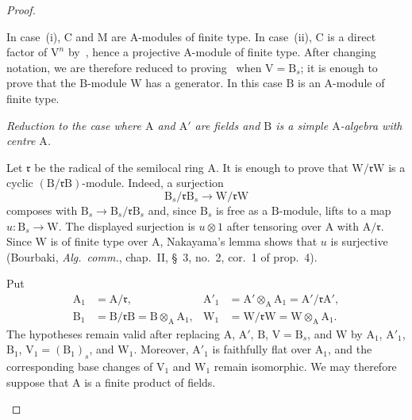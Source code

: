 \begin{proof}
\begin{env}[2.5.8.7]
In case~(i), $\mathrm{C}$ and $\mathrm{M}$ are $\mathrm{A}$-modules of
finite type. In case~(ii), $\mathrm{C}$ is a direct factor of
$\mathrm{V}^n$ by~, hence a projective
$\mathrm{A}$-module of finite type. After changing notation, we are
therefore reduced to proving~ when
$\mathrm{V}=\mathrm{B}_s$; it is enough to prove that the
$\mathrm{B}$-module $\mathrm{W}$ has a generator. In this case
$\mathrm{B}$ is an $\mathrm{A}$-module of finite type.
\end{env}

\begin{env}[2.5.8.8]
\label{IV.2.5.8.8}
\emph{Reduction to the case where $\mathrm{A}$ and $\mathrm{A}'$ are
fields and $\mathrm{B}$ is a simple $\mathrm{A}$-algebra with centre
$\mathrm{A}$.}

Let $\mathfrak{r}$ be the radical of the semilocal ring $\mathrm{A}$.
It is enough to prove that
$\mathrm{W}/\mathfrak{r}\mathrm{W}$ is a cyclic
$(\mathrm{B}/\mathfrak{r}\mathrm{B})$-module. Indeed, a surjection
\[
  \mathrm{B}_s/\mathfrak{r}\mathrm{B}_s
  \longrightarrow \mathrm{W}/\mathfrak{r}\mathrm{W}
\]
composes with $\mathrm{B}_s\to
\mathrm{B}_s/\mathfrak{r}\mathrm{B}_s$ and, since $\mathrm{B}_s$ is
free as a $\mathrm{B}$-module, lifts to a map
$u:\mathrm{B}_s\to\mathrm{W}$. The displayed surjection is
$u\otimes1$ after tensoring over $\mathrm{A}$ with
$\mathrm{A}/\mathfrak{r}$. Since $\mathrm{W}$ is of finite type over
$\mathrm{A}$, Nakayama's lemma shows that $u$ is surjective (Bourbaki,
\emph{Alg.\ comm.}, chap.~II, \S~3, no.~2, cor.~1 of prop.~4).

Put
\[
\begin{aligned}
  \mathrm{A}_1&=\mathrm{A}/\mathfrak{r},&
  \mathrm{A}'_1&=\mathrm{A}'\otimes_{\mathrm{A}}\mathrm{A}_1
                    =\mathrm{A}'/\mathfrak{r}\mathrm{A}',\\
  \mathrm{B}_1&=\mathrm{B}/\mathfrak{r}\mathrm{B}
                    =\mathrm{B}\otimes_{\mathrm{A}}\mathrm{A}_1,&
  \mathrm{W}_1&=\mathrm{W}/\mathfrak{r}\mathrm{W}
                    =\mathrm{W}\otimes_{\mathrm{A}}\mathrm{A}_1.
\end{aligned}
\]
The hypotheses remain valid after replacing $\mathrm{A}$, $\mathrm{A}'$,
$\mathrm{B}$, $\mathrm{V}=\mathrm{B}_s$, and $\mathrm{W}$ by
$\mathrm{A}_1$, $\mathrm{A}'_1$, $\mathrm{B}_1$,
$\mathrm{V}_1=(\mathrm{B}_1)_s$, and $\mathrm{W}_1$. Moreover,
$\mathrm{A}'_1$ is faithfully flat over $\mathrm{A}_1$, and the
corresponding base changes of $\mathrm{V}_1$ and $\mathrm{W}_1$ remain
isomorphic. We may therefore suppose that $\mathrm{A}$ is a finite
product of fields.


\end{env}
\end{proof}
